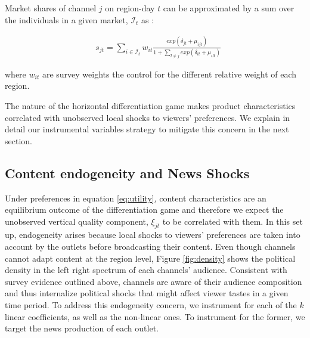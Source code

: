 \documentclass[12pt]{article}
\begin{document}
Market shares of channel $j$ on region-day $t$ can be approximated by a sum over the individuals in a given market, $\mathcal{I}_t$ as : 


\begin{equation}\label{eq:shares}
	\begin{aligned}
		& s_{jt} = \sum_{i \in \mathcal{I}_t} w_{it} \frac{exp(\delta_{jt} + \mu_{ijt})}{ 1+ \sum_{l\neq j } exp(\delta_{lt} + \mu_{ilt}) } 
	\end{aligned}
\end{equation} 

 
 where $w_{it}$ are survey weights the control for the different relative weight of each region. 
 
 

The nature of the horizontal differentiation game makes product characteristics correlated with unobserved local shocks to viewers' preferences.  We explain in detail our instrumental variables strategy to mitigate this concern in the next section. 

\subsection{Content endogeneity and News Shocks} \label{section:endogeneity}


Under preferences in equation \ref{eq:utility}, content characteristics are an equilibrium outcome of the differentiation game and therefore we expect the  unobserved vertical quality component, $ \xi_{jt} $ to be correlated with them. In this set up, endogeneity arises because local shocks to viewers' preferences are taken into account by the outlets before broadcasting their content. Even though channels cannot adapt content at the region level, Figure \ref{fig:density} shows the political density in the left right spectrum of each channels' audience. Consistent with survey evidence outlined above, channels are aware of their audience composition  and thus internalize political shocks that might affect viewer tastes in a given time period. To address this endogeneity concern, we instrument for each of the $ k $ linear coefficients, as well as the non-linear ones. To instrument for the former, we target the news production of each outlet.
\end{document}
